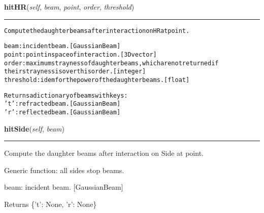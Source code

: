     \label{theia:optics:optic:Optic:hitHR}

    \vspace{0.5ex}

\hspace{.8\funcindent}\begin{boxedminipage}{\funcwidth}

    \raggedright \textbf{hitHR}(\textit{self}, \textit{beam}, \textit{point}, \textit{order}, \textit{threshold})

    \vspace{-1.5ex}

    \rule{\textwidth}{0.5\fboxrule}
\setlength{\parskip}{2ex}
\begin{alltt}
Compute the daughter beams after interaction on HR at point.

beam: incident beam. [GaussianBeam]
point: point in space of interaction. [3D vector]
order: maximum strayness of daughter beams, which are not returned if
    their strayness is over this order. [integer]
threshold: idem for the power of the daughter beams. [float]

Returns a dictionary of beams with keys:
    't': refracted beam. [GaussianBeam]
    'r': reflected beam. [GaussianBeam]
\end{alltt}

\setlength{\parskip}{1ex}
    \end{boxedminipage}

    \label{theia:optics:optic:Optic:hitSide}

    \vspace{0.5ex}

\hspace{.8\funcindent}\begin{boxedminipage}{\funcwidth}

    \raggedright \textbf{hitSide}(\textit{self}, \textit{beam})

    \vspace{-1.5ex}

    \rule{\textwidth}{0.5\fboxrule}
\setlength{\parskip}{2ex}
    Compute the daughter beams after interaction on Side at point.

    Generic function: all sides stop beams.

    beam: incident beam. [GaussianBeam]

    Returns \{'t': None, 'r': None\}

\setlength{\parskip}{1ex}
    \end{boxedminipage}


